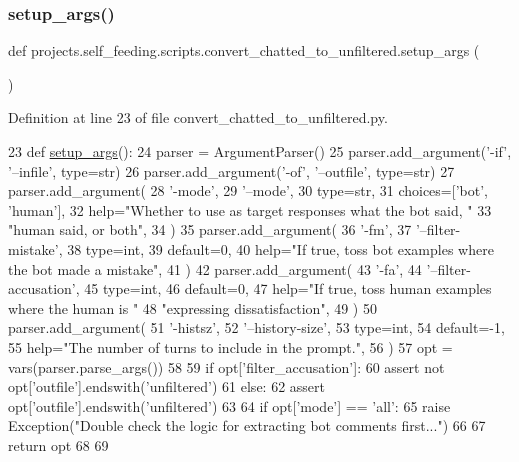 \subsubsection{\texorpdfstring{setup\+\_\+args()}{setup\_args()}}
{\footnotesize\ttfamily def projects.\+self\+\_\+feeding.\+scripts.\+convert\+\_\+chatted\+\_\+to\+\_\+unfiltered.\+setup\+\_\+args (\begin{DoxyParamCaption}{ }\end{DoxyParamCaption})}



Definition at line 23 of file convert\+\_\+chatted\+\_\+to\+\_\+unfiltered.\+py.


\begin{DoxyCode}
23 \textcolor{keyword}{def }\hyperlink{namespaceprojects_1_1self__feeding_1_1scripts_1_1convert__chatted__to__unfiltered_a0c8516f372e45778279d5e8dd120d508}{setup\_args}():
24     parser = ArgumentParser()
25     parser.add\_argument(\textcolor{stringliteral}{'-if'}, \textcolor{stringliteral}{'--infile'}, type=str)
26     parser.add\_argument(\textcolor{stringliteral}{'-of'}, \textcolor{stringliteral}{'--outfile'}, type=str)
27     parser.add\_argument(
28         \textcolor{stringliteral}{'-mode'},
29         \textcolor{stringliteral}{'--mode'},
30         type=str,
31         choices=[\textcolor{stringliteral}{'bot'}, \textcolor{stringliteral}{'human'}],
32         help=\textcolor{stringliteral}{"Whether to use as target responses what the bot said, "}
33         \textcolor{stringliteral}{"human said, or both"},
34     )
35     parser.add\_argument(
36         \textcolor{stringliteral}{'-fm'},
37         \textcolor{stringliteral}{'--filter-mistake'},
38         type=int,
39         default=0,
40         help=\textcolor{stringliteral}{"If true, toss bot examples where the bot made a mistake"},
41     )
42     parser.add\_argument(
43         \textcolor{stringliteral}{'-fa'},
44         \textcolor{stringliteral}{'--filter-accusation'},
45         type=int,
46         default=0,
47         help=\textcolor{stringliteral}{"If true, toss human examples where the human is "}
48         \textcolor{stringliteral}{"expressing dissatisfaction"},
49     )
50     parser.add\_argument(
51         \textcolor{stringliteral}{'-histsz'},
52         \textcolor{stringliteral}{'--history-size'},
53         type=int,
54         default=-1,
55         help=\textcolor{stringliteral}{"The number of turns to include in the prompt."},
56     )
57     opt = vars(parser.parse\_args())
58 
59     \textcolor{keywordflow}{if} opt[\textcolor{stringliteral}{'filter\_accusation'}]:
60         \textcolor{keyword}{assert} \textcolor{keywordflow}{not} opt[\textcolor{stringliteral}{'outfile'}].endswith(\textcolor{stringliteral}{'unfiltered'})
61     \textcolor{keywordflow}{else}:
62         \textcolor{keyword}{assert} opt[\textcolor{stringliteral}{'outfile'}].endswith(\textcolor{stringliteral}{'unfiltered'})
63 
64     \textcolor{keywordflow}{if} opt[\textcolor{stringliteral}{'mode'}] == \textcolor{stringliteral}{'all'}:
65         \textcolor{keywordflow}{raise} Exception(\textcolor{stringliteral}{"Double check the logic for extracting bot comments first..."})
66 
67     \textcolor{keywordflow}{return} opt
68 
69 
\end{DoxyCode}


